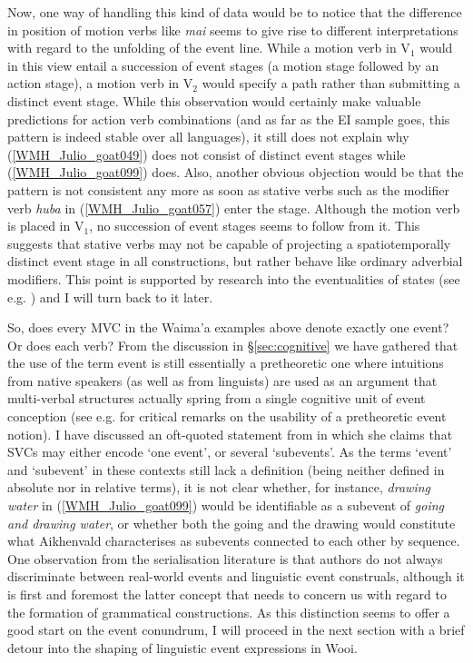 Now, one way of handling this kind of data would be to notice that the difference in position of motion verbs like \textit{mai} seems to give rise to different interpretations with regard to the unfolding of the event line. While a motion verb in V$_1$ would in this view entail a succession of event stages (a motion stage followed by an action stage), a motion verb in V$_2$ would specify a path rather than submitting a distinct event stage. While this observation would certainly make valuable predictions for action verb combinations (and as far as the EI sample goes, this pattern is indeed stable over all languages), it still does not explain why (\ref{WMH_Julio_goat049}) does not consist of distinct event stages while (\ref{WMH_Julio_goat099}) does. Also, another obvious objection would be that the pattern is not consistent any more as soon as stative verbs such as the modifier verb \textit{huba} in (\ref{WMH_Julio_goat057}) enter the stage. Although the motion verb is placed in V$_1$, no succession of event stages seems to follow from it. This suggests that stative verbs may not be capable of projecting a spatiotemporally distinct event stage in all constructions, but rather behave like ordinary adverbial modifiers. This point is supported by research into the eventualities of states (see e.g. \citealt{maienborn2005limits}) and I will turn back to it later.

So, does every MVC in the Waima'a examples above denote exactly one event? Or does each verb? From the discussion in §\ref{sec:cognitive} we have gathered that the use of the term event is still essentially a pretheoretic one where intuitions from native speakers (as well as from linguists) are used as an argument that multi-verbal structures actually spring from a single cognitive unit of event conception (see e.g. \citealt{haspelmath2016serial} for critical remarks on the usability of a pretheoretic event notion). I have discussed an oft-quoted statement from \citet{Aikhenvald2006} in which she claims that SVCs may either encode `one event', or several `subevents'. As the terms `event' and `subevent' in these contexts still lack a definition (being neither defined in absolute nor in relative terms), it is not clear whether, for instance, \textit{drawing water} in (\ref{WMH_Julio_goat099}) would be identifiable as a subevent of \textit{going and drawing water}, or whether both the going and the drawing would constitute what Aikhenvald characterises as subevents connected to each other by sequence. One observation from the serialisation literature is that authors do not always discriminate between real-world events and linguistic event construals, although it is first and foremost the latter concept that needs to concern us with regard to the formation of grammatical constructions. As this distinction seems to offer a good start on the event conundrum, I will proceed in the next section with a brief detour into the shaping of linguistic event expressions in Wooi.

